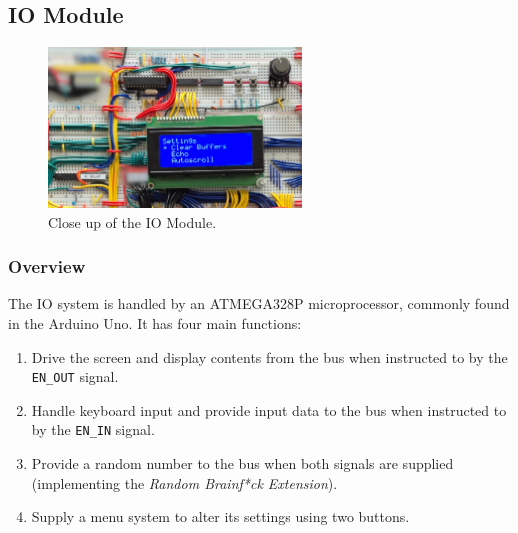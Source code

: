 \newpage\subsection{IO Module} \label{sec:implementation:io}
\begin{figure}[H]
  \centering
  \includegraphics[width=0.6\textwidth]{img/iomodulecloseup}
  \caption{Close up of the IO Module.}
  \label{fig:iomodulecloseup}
\end{figure}

\subsubsection{Overview}
The IO system is handled by an ATMEGA328P microprocessor, commonly found in the Arduino Uno. It has four main functions:
\begin{enumerate}
\item Drive the screen and display contents from the bus when instructed to by the \texttt{EN\_OUT} signal.
\item Handle keyboard input and provide input data to the bus when instructed to by the \texttt{EN\_IN} signal.
\item Provide a random number to the bus when both signals are supplied (implementing the \emph{Random Brainf*ck Extension}).
\item Supply a menu system to alter its settings using two buttons.
\end{enumerate}

